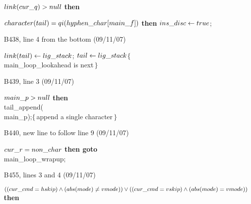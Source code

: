 {{\ninepoint\noindent
\qquad\qquad{} $\\{link}(\\{cur\_q})>\\{null}$ {\bf then}
\par\noindent
\qquad\qquad\qquad{} $\\{character}(\\{tail})=\\{qi}(
  \\{hyphen\_char}[\\{main\_f}])$ {\bf then} $\\{ins\_disc}\gets\\{true}$;

\bugonpage B438, line 4 from the bottom (09/11/07)

\ninepoint\noindent
\quad$\\{link}(\\{tail})\gets\\{lig\_stack}$;
$\\{tail}\gets\\{lig\_stack}$\quad$\{\,$\\{main\_loop\_lookahead} is next$\,\}$

\bugonpage B439, line 3 (09/11/07)

\ninepoint\noindent
{} $\\{main\_p}>\\{null}$ {\bf then}
 \\{tail\_append}(\\{main\_p});\quad$\{\,$append a single character$\,\}$

\bugonpage B440, new line to follow line 9 (09/11/07)

\ninepoint\noindent
{} $\\{cur\_r}=\\{non\_char}$ {\bf then goto}
 \\{main\_loop\_wrapup};

\bugonpage B455, lines 3 and 4 (09/11/07)

\ninepoint\noindent
{} $((\\{cur\_cmd}=\\{hskip})\land(\\{abs}(\\{mode})\ne\\{vmode}))
 \lor  ((\\{cur\_cmd}=\\{vskip})\land(\\{abs}(\\{mode})=\\{vmode}))$ {\bf then}

}}
